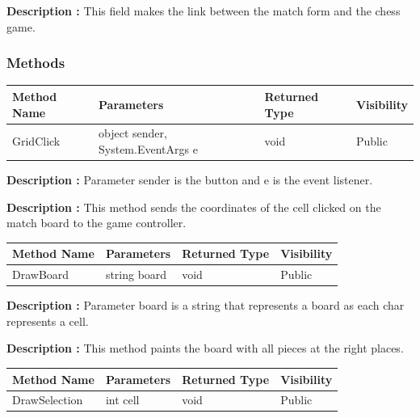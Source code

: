 \documentclass[12pt]{article}
\begin{document}
\textbf{Description :} This field makes the link between the match form and the chess game.

\subsubsection{Methods}

\begin{table}[H]
    \begin{tabular}{|l|l|l|l|}
    \hline
    \rowcolor[HTML]{EFEFEF} 
    \cellcolor[HTML]{EFEFEF}\textbf{Method Name} & \textbf{Parameters}                    & \textbf{Returned Type} & \textbf{Visibility} \\ \hline
    GridClick                                    & object sender, System.EventArgs e      & void                   & Public             \\ \hline
    \end{tabular}
\end{table}

\textbf{Description :} Parameter sender is the button and e is the event listener.

\textbf{Description :} This method sends the coordinates of the cell clicked on the match board to the game controller.

\begin{table}[H]
    \begin{tabular}{|l|l|l|l|}
    \hline
    \rowcolor[HTML]{EFEFEF} 
    \cellcolor[HTML]{EFEFEF}\textbf{Method Name} & \textbf{Parameters}                    & \textbf{Returned Type} & \textbf{Visibility} \\ \hline
    DrawBoard                                    & string board                           & void                   & Public             \\ \hline
    \end{tabular}
\end{table}

\textbf{Description :} Parameter board is a string that represents a board as each char represents a cell.

\textbf{Description :} This method paints the board with all pieces at the right places.

\begin{table}[H]
    \begin{tabular}{|l|l|l|l|}
    \hline
    \rowcolor[HTML]{EFEFEF} 
    \cellcolor[HTML]{EFEFEF}\textbf{Method Name} & \textbf{Parameters}                    & \textbf{Returned Type} & \textbf{Visibility} \\ \hline
    DrawSelection                                    & int cell                           & void                   & Public             \\ \hline
    \end{tabular}
\end{table}
\end{document}
